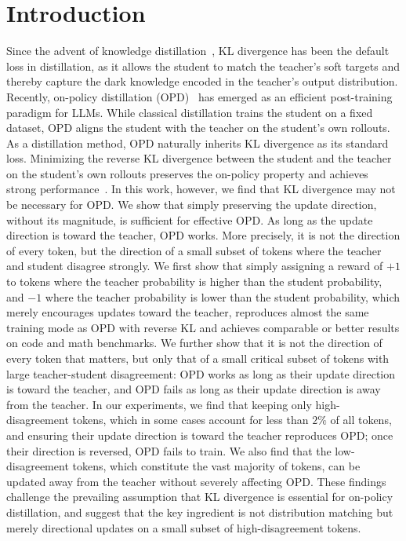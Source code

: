 \documentclass{article}
\theoremstyle{remark}
\begin{document}
\section{Introduction}\label{sec:introduction}
Since the advent of knowledge distillation~\citep{hinton2015distilling}, KL divergence has been the default loss in distillation, as it allows the student to match the teacher's soft targets and thereby capture the dark knowledge encoded in the teacher's output distribution. Recently, on-policy distillation (OPD)~\citep{xu2026deepseek,xiao2026mimo,yang2025qwen3,zeng2026glm} has emerged as an efficient post-training paradigm for LLMs. While classical distillation trains the student on a fixed dataset, OPD aligns the student with the teacher on the student's own rollouts. As a distillation method, OPD naturally inherits KL divergence as its standard loss.
 Minimizing the reverse KL divergence between the student and the teacher on the student's own rollouts preserves the on-policy property and achieves strong performance~\citep{song2026survey,wu2025rethinking,zhang2026fast,zhao2026decoupling}. In this work, however, we find that KL divergence may not be necessary for OPD. We show that simply preserving the update direction, without its magnitude, is sufficient for effective OPD. As long as the update direction is toward the teacher, OPD works. More precisely, it is not the direction of every token, but the direction of a small subset of tokens where the teacher and student disagree strongly. We first show that simply assigning a reward of \(+1\) to tokens where the teacher probability is higher than the student probability, and \(-1\) where the teacher probability is lower than the student probability, which merely encourages updates toward the teacher, reproduces almost the same training mode as OPD with reverse KL and achieves comparable or better results on code and math benchmarks. We further show that it is not the direction of every token that matters, but only that of a small critical subset of tokens with large teacher-student disagreement: OPD works as long as their update direction is toward the teacher, and OPD fails as long as their update direction is away from the teacher. In our experiments, we find that keeping only high-disagreement tokens, which in some cases account for less than \(2\%\) of all tokens, and ensuring their update direction is toward the teacher reproduces OPD; once their direction is reversed, OPD fails to train. We also find that the low-disagreement tokens, which constitute the vast majority of tokens, can be updated away from the teacher without severely affecting OPD. These findings challenge the prevailing assumption that KL divergence is essential for on-policy distillation, and suggest that the key ingredient is not distribution matching but merely directional updates on a small subset of high-disagreement tokens.
\end{document}
